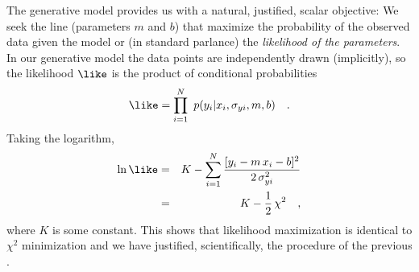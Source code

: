 \documentclass[12pt,twoside,pdftex]{article}
\begin{document}
The generative model provides us with a natural, justified, scalar
objective: We seek the line (parameters $m$ and $b$) that maximize the
probability of the observed data given the model or (in standard
parlance) the \emph{likelihood of the parameters}.  In our generative model the data points are
independently drawn (implicitly), so the likelihood $\like$ is the
product of conditional probabilities
\begin{equation}\label{eq:like}
\like = \prod_{i=1}^N \ p(y_i|x_i,\sigma_{yi},m,b) \quad .
\end{equation}
Taking the logarithm,
\begin{eqnarray}\displaystyle
\ln\like
 & = & K - \sum_{i=1}^N \frac{[y_i - m\,x_i - b]^2}{2\,\sigma_{yi}^2} \nonumber\\
 & = & K - \frac{1}{2}\,\chi^2 \quad ,
\end{eqnarray}
where $K$ is some constant.  This shows that likelihood maximization
is identical to $\chi^2$ minimization and we have justified,
scientifically, the procedure of the previous \sectionname.
\end{document}
